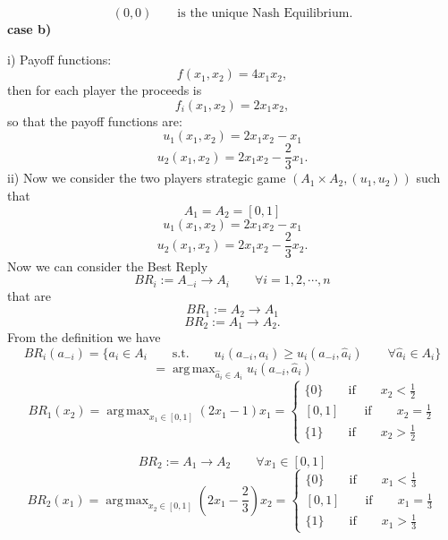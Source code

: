 \documentclass[a4paper, twoside, openany]{book}
\DeclareMathOperator*{\argmax}{arg\,max}
\begin{document}
$$(0,0) \qquad \textrm{is the unique Nash Equilibrium}.$$
\textbf{case b)} \par  
i) Payoff functions:
$$f(x_1, x_2) = 4 x_1 x_2,$$
then for each player the proceeds is
$$f_i(x_1, x_2) = 2x_1 x_2,$$
so that the payoff functions are:
$$u_1(x_1, x_2) = 2 x_1 x_2 - x_1$$
$$u_2(x_1, x_2) = 2x_1 x_2 - \frac{2}{3}x_1.$$
ii) Now we consider the two players strategic game $(A_1 \times A_2, (u_1, u_2))$ such that
$$A_1 = A_2 = [0, 1]$$
$$u_1(x_1, x_2) = 2 x_1 x_2 - x_1$$
$$u_2(x_1, x_2) = 2 x_1 x_2 - \frac{2}{3}x_2.$$
Now we can consider the Best Reply
$$BR_i:= A_{-i} \rightarrow A_i \qquad \forall i = 1, 2, \cdots, n$$
that are
$$BR_1:= A_2 \rightarrow A_1$$
$$BR_2:= A_1 \rightarrow A_2.$$ 
From the definition we have
$$BR_i(a_{-i}) = \{ a_i \in A_i \qquad \textrm{s.t.} \qquad u_i(a_{-i}, a_i) \geq u_i(a_{-i}, \hat{a}_i) \qquad \forall \hat{a}_i \in A_i \}$$
$$ = \argmax_{\hat{a}_i \in A_i} u_i(a_{-i}, \hat{a}_i)$$
$$BR_1(x_2) = \argmax_{x_1 \in [0,1]} (2x_1 - 1)x_1 = \begin{cases}
														\{ 0 \} \qquad \textrm{if} \qquad x_2 < \frac{1}{2} \\
														[0, 1] \qquad \textrm{if} \qquad x_2 = \frac{1}{2}\\
														\{ 1 \} \qquad \textrm{if} \qquad x_2 > \frac{1}{2}
													 \end{cases}$$
													 
\begin{figure}[!ht]
\begin{center}
\end{center}
\end{figure}			
$$BR_2 := A_1 \rightarrow A_2 \qquad \forall x_1 \in [0, 1]$$
$$BR_2(x_1) = \argmax_{x_2 \in [0, 1]} (2x_1 -\frac{2}{3})x_2 = \begin{cases}
																\{ 0 \} \qquad \textrm{if} \qquad x_1 < \frac{1}{3} \\
																[0, 1] \qquad \textrm{if} \qquad x_1 = \frac{1}{3}\\
																\{ 1 \} \qquad \textrm{if} \qquad x_1 > \frac{1}{3}
                                                                \end{cases}$$
                                   
\end{document}
